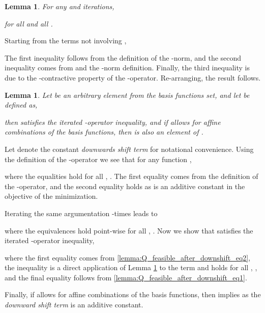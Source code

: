 \documentclass[journal]{IEEEtran}
\newtheorem{lemma}[theorem]{Lemma}
\begin{document}
\vspace{0.1cm}

\begin{lemma} \label{Qform_constraint_violation_infinity_norm}
	For any  and  iterations,
	
	for all  and all .
\end{lemma}

\vspace{0.1cm}

\begin{IEEEproof}
	Starting from the terms not involving ,
	
	The first inequality follows from the definition of the -norm, and the second inequality comes from  and the -norm definition. Finally, the third inequality is due to the -contractive property of the -operator. Re-arranging, the result follows.
\end{IEEEproof}


\vspace{0.1cm}



\begin{lemma} \label{lemma:Q_feasible_after_downshift}
	Let  be an arbitrary element from the basis functions set, and let  be defined as,
	
	then  satisfies the iterated -operator inequality, and if  allows for affine combinations of the basis functions, then  is also an element of .
\end{lemma}

\vspace{0.2cm}

\begin{IEEEproof}
	Let  denote the constant \emph{downwards shift term} for notational convenience. Using the definition of the -operator we see that for any function ,
	
	where the equalities hold for all , . The first equality comes from the definition of the -operator, and the second equality holds as  is an additive constant in the objective of the minimization.
	
	Iterating the same argumentation -times leads to
	
	where the equivalences hold point-wise for all , . Now we show that  satisfies the iterated -operator inequality,
	
	where the first equality comes from \eqref{lemma:Q_feasible_after_downshift_eq2}, the inequality is a direct application of Lemma \ref{Qform_constraint_violation_infinity_norm} to the term  and holds for all , , and the final equality follows from \eqref{lemma:Q_feasible_after_downshift_eq1}.
	
	
	Finally, if  allows for affine combinations of the basis functions, then  implies  as the \emph{downward shift term} is an additive constant.
\end{IEEEproof}
\end{document}
